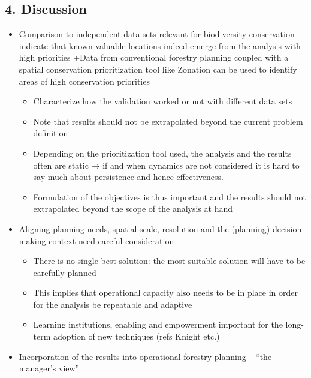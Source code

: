 \documentclass[]{article}
\begin{document}
\subsection{4. Discussion}

\begin{itemize}
\itemsep1pt\parskip0pt
\item
  Comparison to independent data sets relevant for biodiversity
  conservation indicate that known valuable locations indeed emerge from
  the analysis with high priorities +Data from conventional forestry
  planning coupled with a spatial conservation prioritization tool like
  Zonation can be used to identify areas of high conservation priorities

  \begin{itemize}
  \itemsep1pt\parskip0pt
  \item
    Characterize how the validation worked or not with different data
    sets
  \item
    Note that results should not be extrapolated beyond the current
    problem definition
  \item
    Depending on the prioritization tool used, the analysis and the
    results often are static → if and when dynamics are not considered
    it is hard to say much about persistence and hence effectiveness.
  \item
    Formulation of the objectives is thus important and the results
    should not extrapolated beyond the scope of the analysis at hand
  \end{itemize}
\item
  Aligning planning needs, spatial scale, resolution and the (planning)
  decision-making context need careful consideration

  \begin{itemize}
  \itemsep1pt\parskip0pt
  \item
    There is no single best solution: the most suitable solution will
    have to be carefully planned
  \item
    This implies that operational capacity also needs to be in place in
    order for the analysis be repeatable and adaptive
  \item
    Learning institutions, enabling and empowerment important for the
    long-term adoption of new techniques (refs Knight etc.)
  \end{itemize}
\item
  Incorporation of the results into operational forestry planning --
  ``the manager's view''


\end{itemize}
\end{document}
